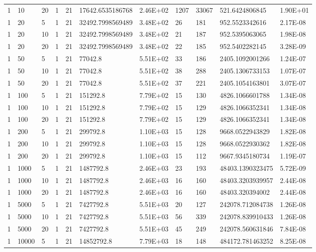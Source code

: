 \begin{table}
\begin{center}
\begin{tabular}{|l|l|l|l|l|l|l|l|l|l|l|}
      1 &  10 & 20  & 1 & 21 & 17642.6535186768 & 2.46E+02 & 1207 & 33067 & 521.6424806845 & 1.90E+01\\
      1 &   20 & 5  & 1 & 21 & 32492.7998569489 & 3.48E+02 & 26 & 181 & 952.5523342616 & 2.17E-08\\
      1 &  20 & 10  & 1 & 21 & 32492.7998569489 & 3.48E+02 & 21 & 187 & 952.5395063065 & 1.98E-08\\
      1 &   20 & 20  & 1 & 21 & 32492.7998569489 & 3.48E+02 & 22 & 185 & 952.5402282145 & 3.28E-09\\
      1 &   50 & 5  & 1 & 21 & 77042.8 & 5.51E+02 & 33 & 186 & 2405.1092001266 & 1.24E-07\\
      1 &   50 & 10  & 1 & 21 & 77042.8 & 5.51E+02 & 38 & 288 & 2405.1306733153 & 1.07E-07\\
      1 &  50 & 20  & 1 & 21 & 77042.8 & 5.51E+02 & 37 & 221 & 2405.1054163801 & 3.07E-07\\
      1 &   100 & 5  & 1 & 21 & 151292.8 & 7.79E+02 & 15 & 130 & 4826.1066601788 & 1.34E-08\\
      1 &  100 & 10  & 1 & 21 & 151292.8 & 7.79E+02 & 15 & 129 & 4826.1066352341 & 1.34E-08\\
      1 &  100 & 20  & 1 & 21 & 151292.8 & 7.79E+02 & 15 & 129 & 4826.1066352341 & 1.34E-08\\
      1 &  200 & 5  & 1 & 21 & 299792.8 & 1.10E+03 & 15 & 128 & 9668.0522943829 & 1.82E-08\\
      1 &  200 & 10  & 1 & 21 & 299792.8 & 1.10E+03 & 15 & 128 & 9668.0522930362 & 1.82E-08\\
      1 &  200 & 20  & 1 & 21 & 299792.8 & 1.10E+03 & 15 & 112 & 9667.9345180734 & 1.19E-07\\
      1 &  1000 & 5  & 1 & 21 & 1487792.8 & 2.46E+03 & 23 & 193 & 48403.1390323475 & 5.72E-09\\
      1 &  1000 & 10  & 1 & 21 & 1487792.8 & 2.46E+03 & 16 & 160 & 48403.3203939957 & 2.44E-08\\
      1 &  1000 & 20  & 1 & 21 & 1487792.8 & 2.46E+03 & 16 & 160 & 48403.320394002 & 2.44E-08\\
      1 & 5000 & 5 & 1 & 21 & 7427792.8 & 5.51E+03 & 20 & 127 & 242078.712084738 & 1.26E-08\\
      1 & 5000 & 10 & 1 & 21 & 7427792.8 & 5.51E+03 & 56 & 339 & 242078.839910433 & 1.26E-08\\
      1 & 5000 & 20 & 1 & 21 & 7427792.8 & 5.51E+03 & 45 & 249 & 242078.560631846 & 7.84E-08\\
      1 & 10000 & 5 & 1 & 21 & 14852792.8 & 7.79E+03 & 18 & 148 & 484172.781463252 & 8.25E-08\\

\end{tabular}
\end{center}
\end{table}
